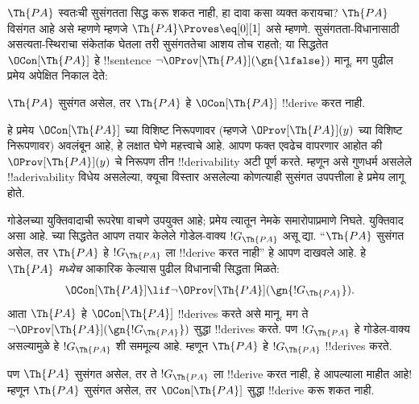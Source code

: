 \documentclass[../../../include/open-logic-section]{subfiles}
\begin{document}


$\Th{PA}$ स्वतःची सुसंगतता सिद्ध करू
शकत नाही, हा दावा कसा व्यक्त करायचा?
$\Th{PA}$ विसंगत आहे असे म्हणणे
म्हणजे $\Th{PA} \Proves \eq[0][1]$
असे म्हणणे. सुसंगतता-विधानासाठी
असत्यता-स्थिराचा संकेतांक घेतला तरी
सुसंगततेचा आशय तोच राहतो; या
सिद्धतेत $\OCon[\Th{PA}]$ हे
!!{sentence} $\lnot
\OProv[\Th{PA}](\gn{\lfalse})$
मानू. मग पुढील प्रमेय अपेक्षित
निकाल देते:

\begin{thm}
$\Th{PA}$ सुसंगत असेल, तर
$\Th{PA}$ हे
$\OCon[\Th{PA}]$ !!{derive}
करत नाही.
\end{thm}

हे प्रमेय $\OCon[\Th{PA}]$
च्या विशिष्ट निरूपणावर
(म्हणजे $\OProv[\Th{PA}](y)$
च्या विशिष्ट निरूपणावर)
अवलंबून आहे, हे लक्षात
घेणे महत्त्वाचे आहे.
आपण फक्त एवढेच वापरणार
आहोत की $\OProv[\Th{PA}](y)$
चे निरूपण तीन
!!{derivability} अटी पूर्ण
करते. म्हणून असे गुणधर्म
असलेले !!a{derivability}
विधेय असलेल्या, क्यूचा विस्तार असलेल्या कोणत्याही
सुसंगत उपपत्तीला हे प्रमेय लागू
होते.

गोडेलच्या युक्तिवादाची
रूपरेषा वाचणे उपयुक्त आहे;
प्रमेय त्यातून नेमके
समारोपाप्रमाणे निघते.
युक्तिवाद असा आहे.
च्या सिद्धतेत आपण तयार
केलेले गोडेल-वाक्य
$!G_\Th{PA}$ असू द्या.
“$\Th{PA}$ सुसंगत
असेल, तर $\Th{PA}$
हे $!G_\Th{PA}$ ला
!!{derive} करत नाही”
हे आपण दाखवले आहे.
हे $\Th{PA}$
\emph{मध्येच} आकारिक
केल्यास पुढील विधानाची
सिद्धता मिळते:
\[
\OCon[\Th{PA}] \lif \lnot \OProv[\Th{PA}](\gn{!G_\Th{PA}}).
\]
आता $\Th{PA}$ हे
$\OCon[\Th{PA}]$
!!{derive}s करते असे
मानू. मग ते $\lnot
\OProv[\Th{PA}](\gn{!G_\Th{PA}})$
सुद्धा !!{derive}s
करते. पण $!G_\Th{PA}$
हे गोडेल-वाक्य असल्यामुळे
हे $!G_\Th{PA}$ शी
सममूल्य आहे. म्हणून
$\Th{PA}$ हे
$!G_\Th{PA}$
!!{derive}s करते.

पण $\Th{PA}$ सुसंगत
असेल, तर ते
$!G_\Th{PA}$ ला
!!{derive} करत
नाही, हे आपल्याला
माहीत आहे!{}
म्हणून $\Th{PA}$
सुसंगत असेल, तर
$\OCon[\Th{PA}]$
सुद्धा !!{derive}
करू शकत नाही.
\end{document}
